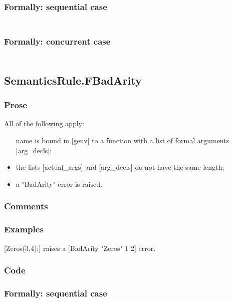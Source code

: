 \documentclass{book}
\begin{document}
  \subsubsection{Formally: sequential case}
  \begin{align}
  \end{align} 

  \subsubsection{Formally: concurrent case}
  \begin{align}
  \end{align} 

\subsection{SemanticsRule.FBadArity \label{sec:SemanticsRule.FBadArity}}

  \subsubsection{Prose}
  All of the following apply:
  \begin{itemize}
  \item [name] is bound in [genv] to a function with a list of formal arguments
    [arg\_decls];
  \item the lists [actual\_args] and [arg\_decls] do not have the same length;
  \item a "BadArity" error is raised.
  \end{itemize}

  \subsubsection{Comments}

  \subsubsection{Examples}
  [Zeros(3,4);] raises a [BadArity "Zeros" 1 2] error.

  \subsubsection{Code}

  \subsubsection{Formally: sequential case}
  \begin{align}
  \end{align} 
\end{document}
